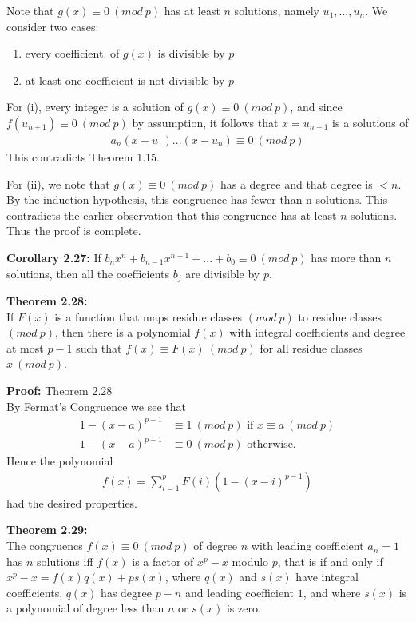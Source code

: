 \documentclass[a4paper]{article}
\begin{document}
Note that $g(x)\equiv 0\ (mod\ p)$ has at least $n$ solutions, namely $u_1,...,u_n$. We consider two cases:

\renewcommand{\theenumi}{\roman{enumi}}
\begin{enumerate}
    \item every coefficient. of $g(x)$ is divisible by $p$
    \item at least one coefficient is not divisible by $p$
\end{enumerate}

For (i), every integer is a solution of $g(x)\equiv 0\ (mod\ p)$, and since $f(u_{n+1})\equiv 0\ (mod\ p)$ by assumption, it follows that $x=u_{n+1}$ is a solutions of
\begin{align}
    a_n(x-u_1)...(x-u_n)\equiv 0\ (mod\ p)
\end{align}
This contradicts Theorem 1.15.

For (ii), we note that $g(x)\equiv 0\ (mod\ p)$ has a degree and that degree is $<n$. By the induction hypothesis, this congruence has fewer than n solutions. This contradicts the earlier observation that this congruence has at least $n$ solutions. Thus the proof is complete.

\textbf{Corollary 2.27:}
If $b_nx^n+b_{n-1}x^{n-1}+...+b_0\equiv 0\ (mod\ p)$ has more than $n$ solutions, then all the coefficients $b_j$ are divisible by $p$.

\textbf{Theorem 2.28:}\\
If $F(x)$ is a function that maps residue classes $(mod\ p)$ to residue classes $(mod\ p)$, then there is a polynomial $f(x)$ with integral coefficients and degree at most $p-1$ such that $f(x)\equiv F(x)\ (mod\ p)$ for all residue classes $x\ (mod\ p)$.

\textbf{Proof:} Theorem 2.28\\
By Fermat's Congruence we see that
\begin{align}
    1-(x-a)^{p-1}&\equiv 1\ (mod\ p)\text{ if } x\equiv a\ (mod\ p)\\
    1-(x-a)^{p-1}&\equiv 0\ (mod\ p) \text{ otherwise.}
\end{align}
Hence the polynomial
\begin{align}
    f(x)=\sum^p_{i=1}F(i)(1-(x-i)^{p-1})
\end{align}
had the desired properties.

\textbf{Theorem 2.29:}\\
The congruencs $f(x)\equiv 0\ (mod\ p)$ of degree $n$ with leading coefficient $a_n=1$ has $n$ solutions iff $f(x)$ is a factor of $x^p-x$ modulo $p$, that is if and only if $x^p-x=f(x)q(x)+ps(x)$, where $q(x)$ and $s(x)$ have integral coefficients, $q(x)$ has degree $p-n$ and leading coefficient $1$, and where $s(x)$ is a polynomial of degree less than $n$ or $s(x)$ is zero.
\end{document}

